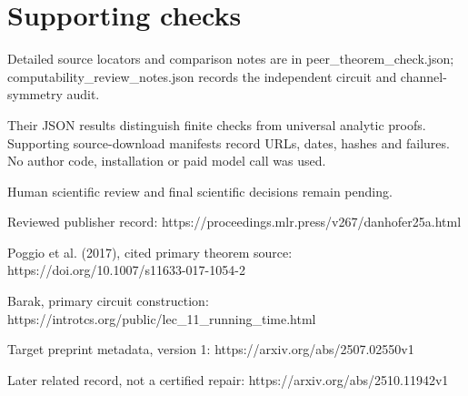 \documentclass[10pt]{article}
\begin{document}
\section*{Supporting checks}
Detailed source locators and comparison notes are in peer\_theorem\_check.json; computability\_review\_notes.json records the independent circuit and channel-symmetry audit.\par
Their JSON results distinguish finite checks from universal analytic proofs. Supporting source-download manifests record URLs, dates, hashes and failures. No author code, installation or paid model call was used.\par
Human scientific review and final scientific decisions remain pending.\par
Reviewed publisher record: https://proceedings.mlr.press/v267/danhofer25a.html\par
Poggio et al. (2017), cited primary theorem source: https://doi.org/10.1007/s11633-017-1054-2\par
Barak, primary circuit construction: https://introtcs.org/public/lec\_11\_running\_time.html\par
Target preprint metadata, version 1: https://arxiv.org/abs/2507.02550v1\par
Later related record, not a certified repair: https://arxiv.org/abs/2510.11942v1\par
\end{document}
